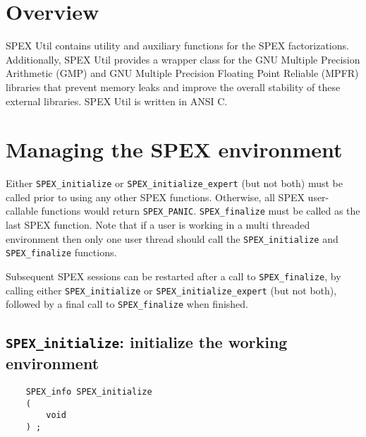 \documentclass[12pt,oneside]{book}
\theoremstyle{definition}
\begin{document}
\section{Overview} \label{s:util:overview}
SPEX Util contains utility and auxiliary functions for the SPEX 
factorizations. Additionally, SPEX Util provides a wrapper class for
the GNU Multiple Precision Arithmetic (GMP) \cite{granlund2015gnu} and GNU
Multiple Precision Floating Point Reliable (MPFR) \cite{fousse2007mpfr}
libraries that prevent memory leaks and improve the overall stability of
these external libraries. SPEX Util is written in ANSI C.


\section{Managing the SPEX environment} \label{s:user:setup}
Either \verb|SPEX_initialize| or \verb|SPEX_initialize_expert| (but not both)
must be called prior to using any other SPEX functions. Otherwise, all SPEX user-callable functions would return \verb|SPEX_PANIC|. \verb|SPEX_finalize|
must be called as the last SPEX function. 
Note that if a user is working in a multi threaded environment then only one user thread should call the \verb|SPEX_initialize| and \verb|SPEX_finalize| functions.

Subsequent SPEX sessions can be restarted after a call to
\verb|SPEX_finalize|, by calling either \verb|SPEX_initialize| or
\verb|SPEX_initialize_expert| (but not both), followed by a final call to
\verb|SPEX_finalize| when finished.


\subsection{\texttt{SPEX\_initialize}: initialize the working environment}
\begin{mdframed}[userdefinedwidth=\textwidth]
{\footnotesize
\begin{verbatim}
    SPEX_info SPEX_initialize
    (
        void
    ) ;
\end{verbatim}
} \end{mdframed}
\end{document}
